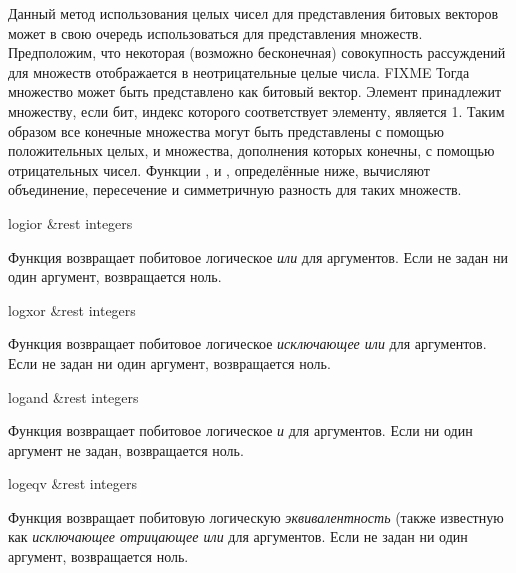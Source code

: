 Данный метод использования целых чисел для представления битовых векторов может
в свою очередь использоваться для представления множеств. Предположим, что
некоторая (возможно бесконечная) совокупность рассуждений для множеств отображается
в неотрицательные целые числа. FIXME
Тогда множество может быть представлено как битовый вектор. Элемент принадлежит
множеству, если бит, индекс которого соответствует элементу, является 1.
Таким образом все конечные множества могут быть представлены с помощью
положительных целых, и множества, дополнения которых конечны, с помощью
отрицательных чисел. Функции ,  и ,
определённые ниже, вычисляют объединение, пересечение и симметричную разность для
таких множеств.

\begin{defun}[Функция]
logior &rest integers

Функция возвращает побитовое логическое \emph{или} для аргументов.
Если не задан ни один аргумент, возвращается ноль.
\end{defun}

\begin{defun}[Функция]
logxor &rest integers

Функция возвращает побитовое логическое \emph{исключающее или} для аргументов.
Если не задан ни один аргумент, возвращается ноль.
\end{defun}

\begin{defun}[Функция]
logand &rest integers

Функция возвращает побитовое логическое \emph{и} для аргументов.
Если ни один аргумент не задан, возвращается ноль.
\end{defun}

\begin{defun}[Функция]
logeqv &rest integers

Функция возвращает побитовую логическую \emph{эквивалентность} (также известную
как \emph{исключающее отрицающее или} для аргументов.
Если не задан ни один аргумент, возвращается ноль.
\end{defun}

